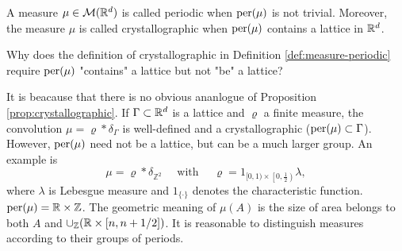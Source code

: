 \documentclass{article}
\begin{document}
\begin{definition}\label{def:measure-periodic}
	A measure $\mu\in \mathcal{M}(\mathbb{R}^d)$ is called periodic when $\operatorname{per}(\mu)$ is not trivial. Moreover, the measure $\mu$ is called crystallographic when $\operatorname{per}(\mu)$ contains a lattice in $\mathbb{R}^d$.
\end{definition}
\begin{remark}
	Why does the definition of crystallographic in Definition \ref{def:measure-periodic} require $\operatorname{per}(\mu)$ "contains" a lattice but not "be" a lattice? 
\end{remark}
It is beacause that there is  no obvious ananlogue of Proposition \ref{prop:crystallographic}. If $\Gamma\subset\mathbb{R}^d$ is a lattice and $\varrho$ a finite measure, the convolution $\mu=\varrho*\delta_{\Gamma}$ is well-defined and a crystallographic ($\operatorname{per}(\mu)\subset\Gamma$). However, $\operatorname{per}(\mu)$ need not be a lattice, but can be a much larger group. An example is
\[\mu=\varrho * \delta_{\mathbb{Z}^{2}} \quad \text { with } \quad \varrho=1_{[0,1) \times\left[0, \frac{1}{2}\right)} \lambda,\]
where $\lambda$ is Lebesgue measure and $1_{\{\cdot\}}$ denotes the characteristic function. $\operatorname{per}(\mu)=\mathbb{R}\times\mathbb{Z}$. The geometric meaning of $\mu(A)$ is the size of area belongs to both $A$ and $\cup_{\mathbb{Z}}(\mathbb{R}\times[n,n+1/2] )$. It is reasonable to distinguish measures according to their groups of periods.




  
  
\end{document}
